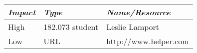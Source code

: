 \begin{tabular}[t]{|l|l|l|}
    \hline
    {\em Impact} & {\em Type} & {\em Name/Resource}\\
    \hline\hline
    High & 182.073 student & Leslie Lamport \\
    Low  & URL & http://www.helper.com \\
    \hline
\end{tabular}